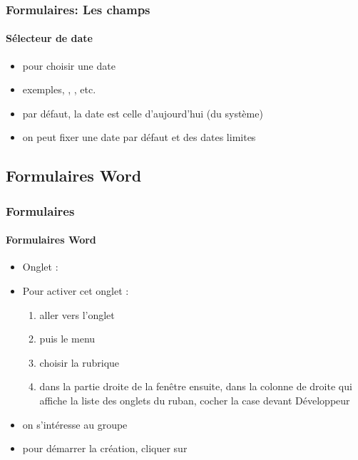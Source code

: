 \documentclass[xcolor=table]{beamer}
\begin{document}
\begin{frame}
\frametitle{Formulaires: Les champs}
\framesubtitle{Sélecteur de date}

\begin{minipage}{0.50\textwidth}
	\begin{itemize}
		\item pour choisir une date
		\item exemples, , , etc.
		\item par défaut, la date est celle d'aujourd'hui (du système)
		\item on peut fixer une date par défaut et des dates limites
	\end{itemize}
\end{minipage}
\begin{minipage}{0.49\textwidth}
\end{minipage}


\end{frame}

\subsection{Formulaires Word}

\begin{frame}
\frametitle{Formulaires}
\framesubtitle{Formulaires Word}

\begin{itemize}
	\item Onglet : 
	\item Pour activer cet onglet : 
	\begin{enumerate}
		\item aller vers l'onglet 
		\item puis le menu 
		\item choisir la rubrique 
		\item dans la partie droite de la fenêtre ensuite, dans la colonne de droite qui affiche la liste des onglets du ruban, cocher la case devant Développeur
	\end{enumerate}
	\item on s'intéresse au groupe  
	\item pour démarrer la création, cliquer sur 
\end{itemize}




\end{frame}
\end{document}
